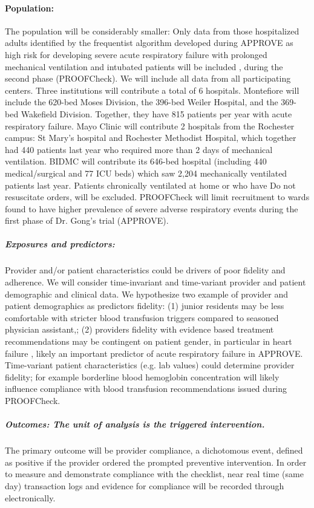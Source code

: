 \documentclass[11pt,notitlepage]{article}
\begin{document}
\paragraph*{Population:} 
The population will be considerably smaller: Only data from those hospitalized adults identified by the frequentist algorithm developed during APPROVE as high risk for developing severe acute respiratory failure with prolonged mechanical ventilation and intubated patients will be included , during the second phase (PROOFCheck). We will include all data from all participating centers. Three institutions will contribute a total of 6 hospitals. Montefiore will include the 620-bed Moses Division, the 396-bed Weiler Hospital, and the 369-bed Wakefield Division. Together, they have 815 patients per year with acute respiratory failure.  Mayo Clinic will contribute 2 hospitals from the Rochester campus: St Mary’s hospital and Rochester Methodist Hospital, which together had 440 patients last year who required more than 2 days of mechanical ventilation.  BIDMC will contribute its 646-bed hospital (including 440 medical/surgical and 77 ICU beds) which saw 2,204 mechanically ventilated patients last year. Patients chronically ventilated at home or who have Do not resuscitate orders, will be excluded. PROOFCheck will limit recruitment to wards found to have higher prevalence of severe adverse respiratory events during the first phase of Dr. Gong's trial (APPROVE). 

\subparagraph*{Exposures and predictors:}
Provider and/or patient characteristics could be drivers of poor fidelity and adherence. We will consider time-invariant and time-variant provider and patient demographic and clinical data. We hypothesize two example of provider and patient demographics as predictors fidelity: (1) junior residents may be less comfortable with stricter blood transfusion triggers compared to seasoned physician assistant,; (2) providers fidelity with evidence based treatment recommendations may be contingent on patient gender, in particular in heart failure \cite{Cook_25714825}, likely an important predictor of acute respiratory failure in APPROVE. Time-variant patient characteristics (e.g. lab values) could determine provider fidelity; for example borderline blood hemoglobin concentration will likely influence compliance with blood transfusion recommendations issued during PROOFCheck. 

\subparagraph*{Outcomes: The unit of analysis is the triggered intervention.}
The primary outcome will be provider compliance, a dichotomous event, defined as positive if the provider ordered the prompted preventive intervention. In order to measure and demonstrate compliance with the checklist, near real time (same day) transaction logs and evidence for compliance will be recorded through electronically.
\end{document}
